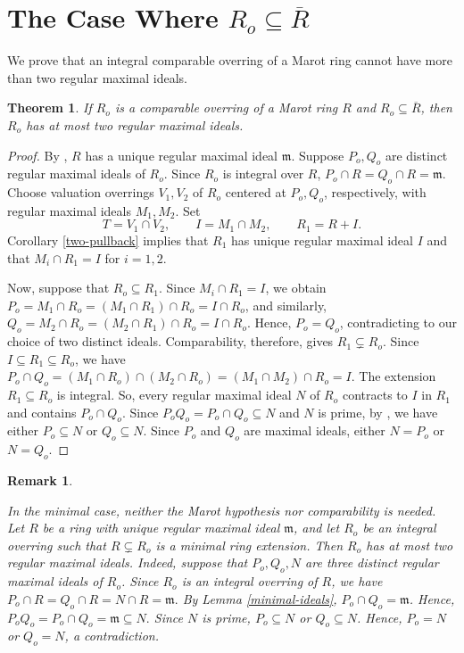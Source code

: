 \documentclass[12pt]{article}
\newtheorem{theorem}{Theorem}
\newtheorem{remark}{Remark}
\begin{document}
	\section{The Case Where $R_o\subseteq\overline R$}\label{sec-integral}
	We prove that an integral comparable overring of a Marot ring cannot have more than two regular maximal ideals.
	\begin{theorem}\label{at-most-two}
		If $R_o$ is a comparable overring of a Marot ring $R$ and $R_o\subseteq\overline R$, then $R_o$ has at most two regular maximal ideals.
	\end{theorem}
	\begin{proof}
		By \cite[Proposition 3.3]{marot}, $R$ has a unique regular maximal ideal $\mathfrak{m}$. Suppose $P_o,Q_o$ are distinct regular maximal ideals of $R_o$. Since $R_o$ is integral over $R$, $P_o\cap R=Q_o\cap R=\mathfrak{m}$. Choose valuation overrings $V_1,V_2$ of $R_o$ centered at $P_o,Q_o$, respectively, with regular maximal ideals $M_1,M_2$. Set
		\[
		T=V_1\cap V_2,\qquad I=M_1\cap M_2,\qquad R_1=R+I.
		\]
		Corollary \ref{two-pullback} implies that $R_1$ has unique regular maximal ideal $I$ and that $M_i\cap R_1=I$ for $i=1,2$.
		
		Now, suppose that $R_o\subseteq R_1$. Since $M_i\cap R_1=I$, we obtain $P_o=M_1\cap R_o=(M_1\cap R_1)\cap R_o=I\cap R_o$, and similarly, $Q_o=M_2\cap R_o=(M_2\cap R_1)\cap R_o=I\cap R_o$. Hence, $P_o=Q_o$, contradicting to our choice of two distinct ideals. Comparability, therefore, gives $R_1\subsetneq R_o$. Since $I\subseteq R_1\subseteq R_o$, we have $P_o\cap Q_o=(M_1\cap R_o)\cap(M_2\cap R_o)=(M_1\cap M_2)\cap R_o=I$. The extension $R_1\subseteq R_o$ is integral. So, every regular maximal ideal $N$ of $R_o$ contracts to $I$ in $R_1$ and contains $P_o\cap Q_o$. Since $P_oQ_o=P_o\cap Q_o\subseteq N$ and $N$ is prime, by \cite[Proposition 1.11]{atiyah}, we have either $P_o\subseteq N$ or $Q_o\subseteq N$. Since $P_o$ and $Q_o$ are maximal ideals, either $N=P_o$ or $N=Q_o$.
	\end{proof}

\begin{remark}\label{minimal-without-marot}
	
		In the minimal case, neither the Marot hypothesis nor comparability is needed. Let $R$ be a ring with unique regular maximal ideal $\mathfrak{m}$, and let $R_o$ be an integral overring such that $R\subsetneq R_o$ is a minimal ring extension. Then $R_o$ has at most two regular maximal ideals. Indeed, suppose that $P_o,Q_o,N$ are three distinct regular maximal ideals of $R_o$. Since $R_o$ is an integral overring of $R$, we have $P_o\cap R=Q_o\cap R=N\cap R=\mathfrak{m}.$ By Lemma \ref{minimal-ideals}, $P_o\cap Q_o=\mathfrak{m}$. Hence, $P_oQ_o=P_o\cap Q_o=\mathfrak{m}\subseteq N. $ Since $N$ is prime, $P_o\subseteq N$ or $Q_o\subseteq N$. Hence, $P_o=N$ or $Q_o=N$, a contradiction. 
	\end{remark}
\end{document}
